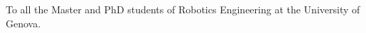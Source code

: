 
\begin{dedication}

To all the Master and PhD students of Robotics Engineering at the University of Genova.
\end{dedication}


